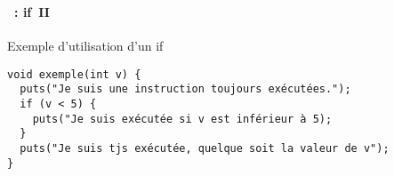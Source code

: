 \begin{frame}[containsverbatim]
  \frametitle{\secname}
  \framesubtitle{\subsecname~: if~II}

  \begin{exampleblock}{Exemple d'utilisation d'un if}
    \begin{verbatim}
void exemple(int v) {
  puts("Je suis une instruction toujours exécutées.");
  if (v < 5) {
    puts("Je suis exécutée si v est inférieur à 5);
  }
  puts("Je suis tjs exécutée, quelque soit la valeur de v");
}\end{verbatim}
  \end{exampleblock}

\end{frame}

